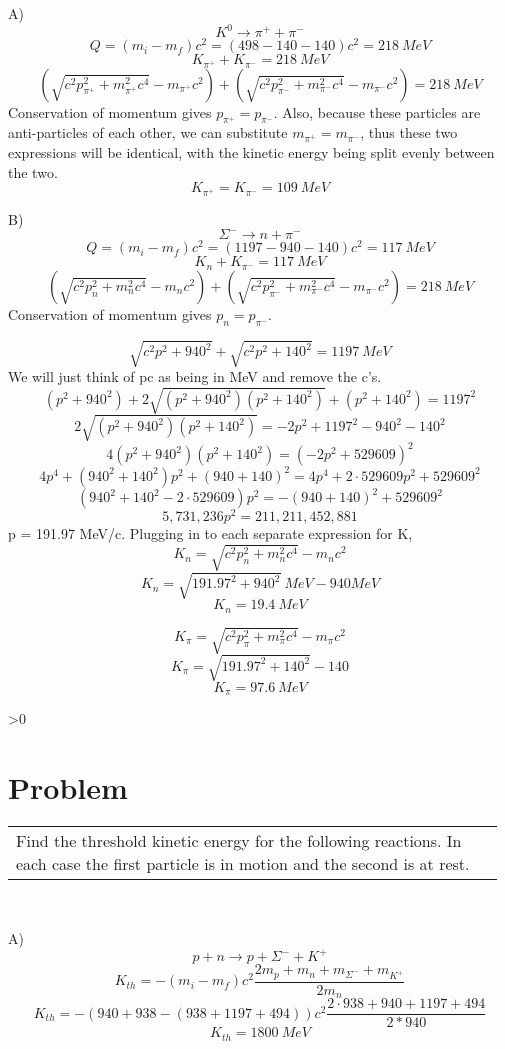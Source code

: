 \documentclass{article}
\newcounter{problemnumber}\setcounter{problemnumber}{1}
\newcommand{\problem}[1][-1]{
    \setcounter{partnumber}{1}
    \ifnum#1>0
        \setcounter{problemnumber}{#1}
    \fi
    \section*{Problem \arabic{problemnumber}}
    \stepcounter{problemnumber}
}
\newcounter{partnumber}\setcounter{partnumber}{1}
\newenvironment{question}{
    \color{gray}\itshape
    \vspace{5pt}
    \begin{tabular}{|p{0.97\linewidth}}
}{
    \end{tabular}\\[5pt]
}
\begin{document}
A)\\
$$ K^0 \rightarrow \pi^+ + \pi^- $$
$$Q = (m_i - m_f)c^2 = (498 - 140 - 140)c^2 = 218\ MeV $$
$$ K_{\pi^+} + K_{\pi^-} = 218\ MeV $$
$$ \left(\sqrt{c^2p_{\pi^+}^2 + m^2_{\pi^+}c^4} - m_{\pi^+}c^2 \right) +
	\left(\sqrt{c^2p_{\pi^-}^2 + m^2_{\pi^-}c^4} - m_{\pi^-}c^2 \right) = 218\ MeV $$
Conservation of momentum gives $p_{\pi^+} = p_{\pi^-}$. Also,
because these particles are anti-particles of each other,
we can substitute $m_{\pi^+} = m_{\pi^-}$, thus these two
expressions will be identical, with the kinetic energy
being split evenly between the two. 
$$ K_{\pi^+} = K_{\pi^-} = 109\ MeV $$

B)\\
$$ \Sigma^- \rightarrow n + \pi^- $$
$$Q = (m_i - m_f)c^2 = (1197 - 940 - 140)c^2 = 117\ MeV $$
$$ K_{n} + K_{\pi^-} = 117\ MeV $$
$$ \left(\sqrt{c^2p_{n}^2 + m^2_{n}c^4} - m_{n}c^2 \right) +
	\left(\sqrt{c^2p_{\pi^-}^2 + m^2_{\pi^-}c^4} - m_{\pi^-}c^2 \right) = 218\ MeV $$
Conservation of momentum gives $p_{n} = p_{\pi^-}$. 

$$ \sqrt{c^2p^2 + 940^2} + \sqrt{c^2p^2 + 140^2} = 1197\ MeV $$
We will just think of pc as being in MeV and remove the c's.
$$ (p^2 + 940^2) + 2\sqrt{(p^2 + 940^2)(p^2 + 140^2)} + (p^2 + 140^2) = 1197^2 $$
$$ 2\sqrt{(p^2 + 940^2)(p^2 + 140^2)} = -2p^2 + 1197^2 - 940^2 - 140^2 $$
$$ 4(p^2 + 940^2)(p^2 + 140^2) = (-2p^2 + 529609)^2 $$
$$ 4p^4 + (940^2 + 140^2)p^2 + (940 + 140)^2 = 4p^4 + 2 \cdot 529609p^2 + 529609^2 $$
$$ (940^2 + 140^2 - 2 \cdot 529609)p^2  = -(940 + 140)^2 + 529609^2 $$
$$ 5,731,236 p^2  = 211,211,452,881 $$
p = 191.97 MeV/c. Plugging in to each separate expression for K,
$$ K_{n} = \sqrt{c^2p_{n}^2 + m^2_{n}c^4} - m_{n}c^2 $$
$$ K_{n} = \sqrt{191.97^2 + 940^2}\ MeV - 940 MeV $$
$$ K_{n} = 19.4\ MeV $$

$$ K_{\pi} = \sqrt{c^2p_{\pi}^2 + m^2_{\pi}c^4} - m_{\pi}c^2 $$
$$ K_{\pi} = \sqrt{191.97^2 + 140^2} - 140 $$
$$ K_{\pi} = 97.6\ MeV $$

\newpage
\problem
\begin{question}
	Find the threshold kinetic energy for the following reactions. In each case the first particle is in motion and the second is at rest.
\end{question}

A) $$ p + n \rightarrow p + \Sigma^- + K^+ $$
$$ K_{th} = -(m_i - m_f)c^2\frac{2m_p + m_n + m_{\Sigma^-} + m_{K^+}}{2m_n} $$
$$ K_{th} = -(940+938-(938+1197+494))c^2\frac{2\cdot 938 + 940 + 1197 + 494}{2*940} $$
$$ K_{th} = 1800\ MeV $$
\end{document}
